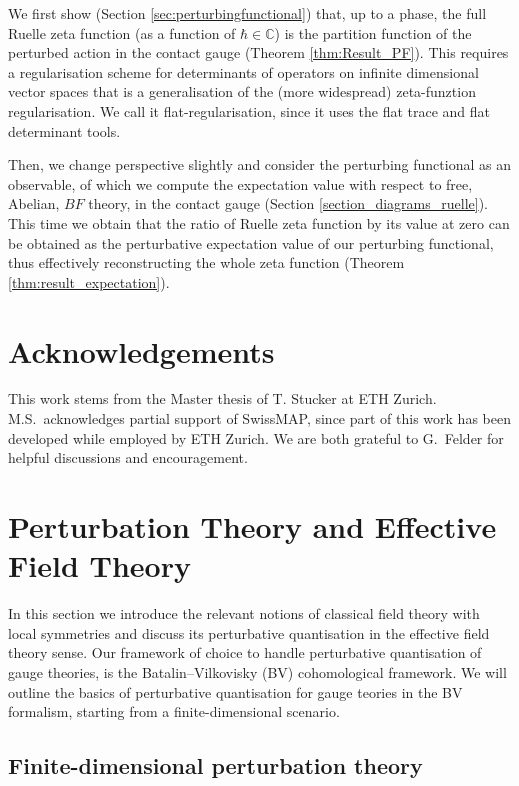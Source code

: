 \documentclass[reqno]{amsart}
\theoremstyle{definition}
\theoremstyle{remark}
\begin{document}
We first show (Section \ref{sec:perturbingfunctional}) that, up to a phase, the full Ruelle zeta function (as a function of $\hbar\in\mathbb{C}$) is the partition function of the perturbed action in the contact gauge (Theorem \ref{thm:Result_PF}). This requires a regularisation scheme for determinants of operators on infinite dimensional vector spaces that is a generalisation of the (more widespread) zeta-funztion regularisation. We call it flat-regularisation, since it uses the flat trace and flat determinant tools.

Then, we change perspective slightly and consider the perturbing functional as an observable, of which we compute the expectation value with respect to free, Abelian, $BF$ theory, in the contact gauge (Section \ref{section_diagrams_ruelle}). This time we obtain that the ratio of Ruelle zeta function by its value at zero can be obtained as the perturbative expectation value of our perturbing functional, thus effectively reconstructing the whole zeta function (Theorem \ref{thm:result_expectation}).

\section*{Acknowledgements}
This work stems from the Master thesis of T. Stucker at ETH Zurich. M.S.\ acknowledges partial support of SwissMAP, since part of this work has been developed while employed by ETH Zurich. We are both grateful to G.\ Felder for helpful discussions and encouragement.


\section{Perturbation Theory and Effective Field Theory}
\label{section_perturbation_theory}

In this section we introduce the relevant notions of classical field theory with local symmetries and discuss its perturbative quantisation in the effective field theory sense. Our framework of choice to handle perturbative quantisation of gauge theories, is the Batalin--Vilkovisky (BV) cohomological framework. We will outline the basics of perturbative quantisation for gauge teories in the BV formalism, starting from a finite-dimensional scenario.

\medskip 





\subsection{Finite-dimensional perturbation theory}\label{section_perturbation_theory_details}
\end{document}
